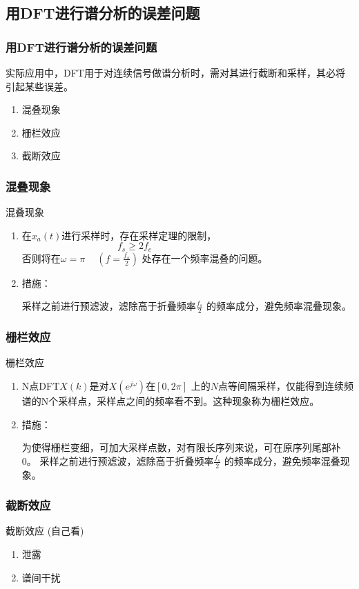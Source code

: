 \documentclass[notheorems,compress,mathserif,table]{beamer}
\begin{document}
\subsection{用DFT进行谱分析的误差问题}
\begin{frame}[shrink]\frametitle{用DFT进行谱分析的误差问题}%

 实际应用中，DFT用于对连续信号做谱分析时，需对其进行截断和采样，其必将引起某些误差。
\begin{enumerate}
  \item 混叠现象
  \item 栅栏效应
  \item 截断效应
\end{enumerate}

\end{frame}
%
%
\begin{frame}[shrink]\frametitle{混叠现象}%

 混叠现象  \par
     \begin{enumerate}
       \item  在$x_a(t)$进行采样时，存在采样定理的限制，
              $$f_s \geq 2 f_c\quad\qquad\qquad\qquad\qquad\qquad$$
              否则将在$\omega = \pi\quad\:$$(f=\frac{f_s}{2})$ 处存在一个频率混叠的问题。
       \item  措施：\par
              采样之前进行预滤波，滤除高于折叠频率$\frac{f_s}{2}$ 的频率成分，避免频率混叠现象。
     \end{enumerate}
\end{frame}
%
%
%
\begin{frame}[shrink]\frametitle{栅栏效应}%
 栅栏效应
     \begin{enumerate}
       \item  N点DFT$X(k)$是对$X(e^{j\omega})$在$[0,2\pi]$ 上的$N$点等间隔采样，仅能得到连续频谱的N个采样点，采样点之间的频率看不到。这种现象称为栅栏效应。
       \item  措施：\par 为使得栅栏变细，可加大采样点数，对有限长序列来说，可在原序列尾部补0。
              采样之前进行预滤波，滤除高于折叠频率$\frac{f_s}{2}$ 的频率成分，避免频率混叠现象。
     \end{enumerate}
\end{frame}
%
%
%
%
\begin{frame}[shrink]\frametitle{截断效应}%
   截断效应  \qquad(自己看)
  \begin{enumerate}
    \item 泄露
    \item 谱间干扰
  \end{enumerate}

\end{frame}
\end{document}
